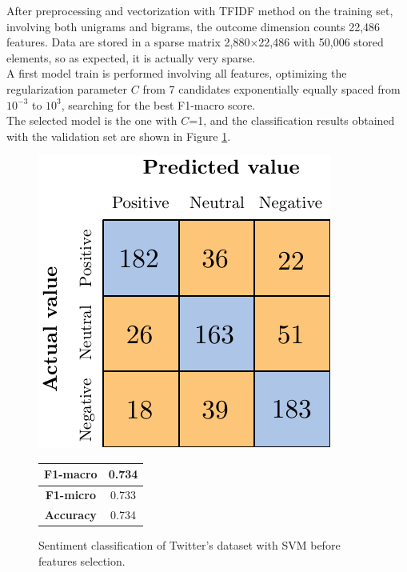 After preprocessing and vectorization with \ac{TFIDF} method on the training set, involving both unigrams and bigrams, the outcome dimension counts 22,486 features. Data are stored in a sparse matrix 2,880$\times$22,486 with 50,006 stored elements, so as expected, it is actually very sparse.\\
A first model train is performed involving all features, optimizing the regularization parameter $C$ from 7 candidates exponentially equally spaced from $10^{-3}$ to $10^3$, searching for the best F1-macro score.\\
The selected model is the one with $C$=1, and the classification results obtained with the validation set are shown in Figure \ref{fig:twitter_snt_svm_bfs}.

\begin{figure}[H]
\begin{minipage}[b]{0.60\linewidth}
	\centering
	\includegraphics[scale=1]{figures/conf_matrices/twitter_snt_svm/twitter_snt_svm_bfs.pdf}
\end{minipage}
\begin{minipage}[b]{0.30\linewidth}
	\centering
		\begin{tabular}[b]{ | c | c | } 
		\hline
		\textbf{F1-macro} & 0.734 \\
		\hline
		\textbf{F1-micro} & 0.733 \\ 
		\hline
		\textbf{Accuracy} & 0.734 \\ 
		\hline
	\end{tabular}
\end{minipage}
\caption{Sentiment classification of Twitter's dataset with SVM before features selection.}
\label{fig:twitter_snt_svm_bfs}
\end{figure}



